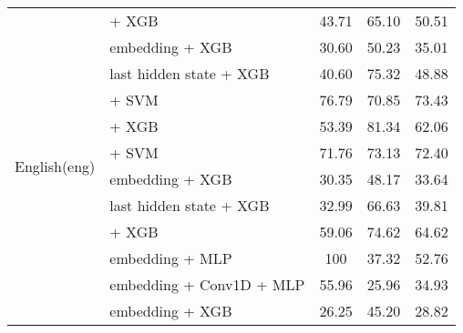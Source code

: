 \begin{longtable}{llccc}
    \multirow{16}{*}{English(eng)}        & \citep{all-MiniLM-L12-v2}  + XGB                                   & 43.71                                & 65.10               & 50.51             \\
                                          & \citep{DBLP:journals/corr/abs-1810-04805} embedding + XGB          & 30.60                                 & 50.23              & 35.01             \\
                                          & \citep{DBLP:journals/corr/abs-1810-04805} last hidden state + XGB  & 40.60                                 & 75.32              & 48.88             \\
                                          & \citep{wang2024multilingual} + SVM                                 & 76.79                                & 70.85              & 73.43             \\
                                          & \citep{zhang2025jasperstelladistillationsota} + XGB                & 53.39                                & 81.34              & 62.06             \\
                                          & \citep{zhang2025jasperstelladistillationsota} + SVM                & 71.76                                & 73.13              & 72.40             \\
                                          & \citep{DBLP:journals/corr/abs-1907-11692} embedding + XGB          & 30.35                                & 48.17              & 33.64             \\
                                          & \citep{DBLP:journals/corr/abs-1907-11692} last hidden state + XGB  & 32.99                                & 66.63              & 39.81             \\
                                          & \citep{ni2021sentencet5scalablesentenceencoders} + XGB             & 59.06                                & 74.62              & 64.62             \\
                                          & \citep{DBLP:journals/corr/abs-1911-02116} embedding + MLP          & 100                                  & 37.32              & 52.76             \\
                                          & \citep{DBLP:journals/corr/abs-1911-02116} embedding + Conv1D + MLP & 55.96                                & 25.96              & 34.93             \\
                                          & \citep{DBLP:journals/corr/abs-1911-02116} embedding + XGB          & 26.25                                & 45.20              & 28.82             \\

\end{longtable}
